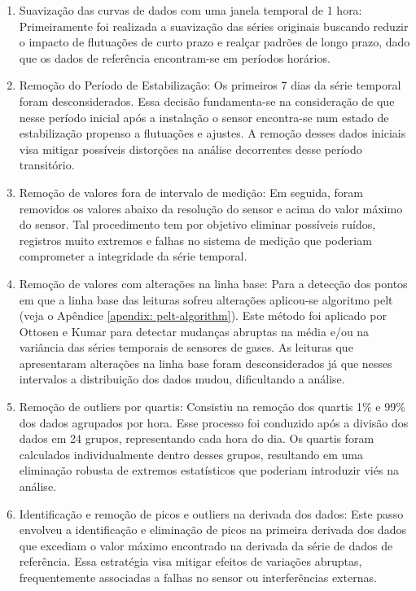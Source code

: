 \begin{enumerate}
    \item Suavização das curvas de dados com uma janela temporal de 1 hora: Primeiramente foi realizada a suavização das séries originais buscando reduzir o impacto de flutuações de curto prazo e realçar padrões de longo prazo, dado que os dados de referência encontram-se em períodos horários.
    \item Remoção do Período de Estabilização: Os primeiros 7 dias da série temporal foram desconsiderados. Essa decisão fundamenta-se na consideração de que nesse período inicial após a instalação o sensor encontra-se num estado de estabilização propenso a flutuações e ajustes. A remoção desses dados iniciais visa mitigar possíveis distorções na análise decorrentes desse período transitório.
    \item Remoção de valores fora de intervalo de medição: Em seguida, foram removidos os valores abaixo da resolução do sensor e acima do valor máximo do sensor. Tal procedimento tem por objetivo eliminar possíveis ruídos, registros muito extremos e falhas no sistema de medição que poderiam comprometer a integridade da série temporal.
    \item Remoção de valores com alterações na linha base: Para a detecção dos pontos em que a linha base das leituras sofreu alterações aplicou-se algoritmo \acrshort{pelt} (veja o Apêndice \ref{apendix: pelt-algorithm}). Este método foi aplicado por Ottosen e Kumar \cite{Ottosen2019OutlierMeasurements} para detectar mudanças abruptas na média e/ou na variância das séries temporais de sensores de gases. As leituras que apresentaram alterações na linha base foram desconsiderados já que nesses intervalos a distribuição dos dados mudou, dificultando a análise.
    \item Remoção de outliers por quartis: Consistiu na remoção dos quartis 1\% e 99\% dos dados agrupados por hora. Esse processo foi conduzido após a divisão dos dados em 24 grupos, representando cada hora do dia. Os quartis foram calculados individualmente dentro desses grupos, resultando em uma eliminação robusta de extremos estatísticos que poderiam introduzir viés na análise.
    \item Identificação e remoção de picos e outliers na derivada dos dados: Este passo envolveu a identificação e eliminação de picos na primeira derivada dos dados que excediam o valor máximo encontrado na derivada da série de dados de referência. Essa estratégia visa mitigar efeitos de variações abruptas, frequentemente associadas a falhas no sensor ou interferências externas.

\end{enumerate}
